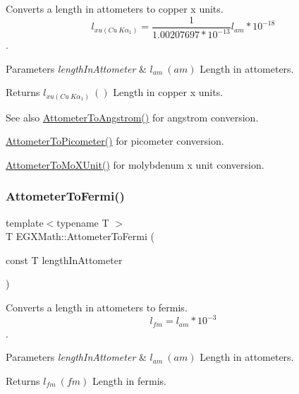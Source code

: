Converts a length in attometers to copper x units. \[ l_{xu(Cu\ K\alpha_1)}= \frac{1}{1.00207697*10^{-13}} l_{am} * 10^{-18} \]. 


\begin{DoxyParams}{Parameters}
{\em length\+In\+Attometer} & $ l_{am}\ (am)$ Length in attometers. \\
\hline
\end{DoxyParams}
\begin{DoxyReturn}{Returns}
$ l_{xu(Cu\ K\alpha_1)}\ ()$ Length in copper x units. 
\end{DoxyReturn}
\begin{DoxySeeAlso}{See also}
\mbox{\hyperlink{group___e_g_x_math-_conversions-_length_conversions-_attometer-_non-_s_i_ga331ff6e8159f6f00bb7a20e39fa4d756}{Attometer\+To\+Angstrom()}} for angstrom conversion. 

\mbox{\hyperlink{group___e_g_x_math-_conversions-_length_conversions-_attometer-_s_i_ga46ccf47b501bffeb16bc792377e55991}{Attometer\+To\+Picometer()}} for picometer conversion. 

\mbox{\hyperlink{group___e_g_x_math-_conversions-_length_conversions-_attometer-_non-_s_i_ga79ec6f4ec4a97af05fe8f69b80805ab7}{Attometer\+To\+Mo\+X\+Unit()}} for molybdenum x unit conversion. 
\end{DoxySeeAlso}
\mbox{\label{group___e_g_x_math-_conversions-_length_conversions-_attometer-_non-_s_i_ga7dc342fa730e646b020d60aa6c2848ef}} 
\subsubsection{\texorpdfstring{Attometer\+To\+Fermi()}{AttometerToFermi()}}
{\footnotesize\ttfamily template$<$typename T $>$ \\
T E\+G\+X\+Math\+::\+Attometer\+To\+Fermi (\begin{DoxyParamCaption}\item[{const T}]{length\+In\+Attometer }\end{DoxyParamCaption})}



Converts a length in attometers to fermis. \[ l_{fm}=l_{am} * 10^{-3} \]. 


\begin{DoxyParams}{Parameters}
{\em length\+In\+Attometer} & $ l_{am}\ (am)$ Length in attometers. \\
\hline
\end{DoxyParams}
\begin{DoxyReturn}{Returns}
$ l_{fm}\ (fm)$ Length in fermis. 
\end{DoxyReturn}
\mbox{\label{group___e_g_x_math-_conversions-_length_conversions-_attometer-_non-_s_i_ga9aaf945221fbc8d469121e0fd0980b41}} 
